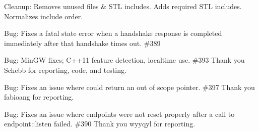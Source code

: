 \begin{DoxyItemize}
\item Cleanup\+: Removes unused files \& STL includes. Adds required STL includes. Normalizes include order.
\item Bug\+: Fixes a fatal state error when a handshake response is completed immediately after that handshake times out. \#389
\item Bug\+: Min\+GW fixes; C++11 feature detection, localtime use. \#393 Thank you Schebb for reporting, code, and testing.
\item Bug\+: Fixes an issue where {\ttfamily {}} could return an out of scope pointer. \#397 Thank you fabioang for reporting.
\item Bug\+: Fixes an issue where endpoints were not reset properly after a call to {\ttfamily endpoint\+::listen} failed. \#390 Thank you wyyqyl for reporting.
\end{DoxyItemize}

